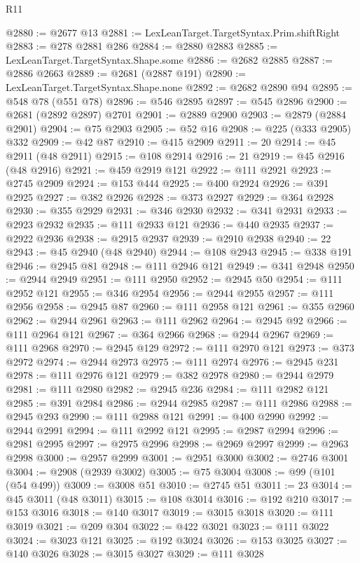 \begin{lexlean}{R11}
\begin{coremodule}
@2880 := @2677 @13
@2881 := LexLeanTarget.TargetSyntax.Prim.shiftRight
@2883 := @278 @2881 @286
@2884 := @2880 @2883
@2885 := LexLeanTarget.TargetSyntax.Shape.some
@2886 := @2682 @2885
@2887 := @2886 @2663
@2889 := @2681 (@2887 @191)
@2890 := LexLeanTarget.TargetSyntax.Shape.none
@2892 := @2682 @2890 @94
@2895 := @548 @78 (@551 @78)
@2896 := @546 @2895
@2897 := @545 @2896
@2900 := @2681 (@2892 @2897) @2701
@2901 := @2889 @2900
@2903 := @2879 (@2884 @2901)
@2904 := @75 @2903
@2905 := @52 @16
@2908 := @225 (@333 @2905) @332
@2909 := @42 @87
@2910 := @415 @2909
@2911 := 20
@2914 := @45 @2911 (@48 @2911)
@2915 := @108 @2914
@2916 := 21
@2919 := @45 @2916 (@48 @2916)
@2921 := @459 @2919 @121
@2922 := @111 @2921
@2923 := @2745 @2909
@2924 := @153 @444
@2925 := @400 @2924
@2926 := @391 @2925
@2927 := @382 @2926
@2928 := @373 @2927
@2929 := @364 @2928
@2930 := @355 @2929
@2931 := @346 @2930
@2932 := @341 @2931
@2933 := @2923 @2932
@2935 := @111 @2933 @121
@2936 := @440 @2935
@2937 := @2922 @2936
@2938 := @2915 @2937
@2939 := @2910 @2938
@2940 := 22
@2943 := @45 @2940 (@48 @2940)
@2944 := @108 @2943
@2945 := @338 @191
@2946 := @2945 @81
@2948 := @111 @2946 @121
@2949 := @341 @2948
@2950 := @2944 @2949
@2951 := @111 @2950
@2952 := @2945 @50
@2954 := @111 @2952 @121
@2955 := @346 @2954
@2956 := @2944 @2955
@2957 := @111 @2956
@2958 := @2945 @87
@2960 := @111 @2958 @121
@2961 := @355 @2960
@2962 := @2944 @2961
@2963 := @111 @2962
@2964 := @2945 @92
@2966 := @111 @2964 @121
@2967 := @364 @2966
@2968 := @2944 @2967
@2969 := @111 @2968
@2970 := @2945 @129
@2972 := @111 @2970 @121
@2973 := @373 @2972
@2974 := @2944 @2973
@2975 := @111 @2974
@2976 := @2945 @231
@2978 := @111 @2976 @121
@2979 := @382 @2978
@2980 := @2944 @2979
@2981 := @111 @2980
@2982 := @2945 @236
@2984 := @111 @2982 @121
@2985 := @391 @2984
@2986 := @2944 @2985
@2987 := @111 @2986
@2988 := @2945 @293
@2990 := @111 @2988 @121
@2991 := @400 @2990
@2992 := @2944 @2991
@2994 := @111 @2992 @121
@2995 := @2987 @2994
@2996 := @2981 @2995
@2997 := @2975 @2996
@2998 := @2969 @2997
@2999 := @2963 @2998
@3000 := @2957 @2999
@3001 := @2951 @3000
@3002 := @2746 @3001
@3004 := @2908 (@2939 @3002)
@3005 := @75 @3004
@3008 := @99 (@101 (@54 @499))
@3009 := @3008 @51
@3010 := @2745 @51
@3011 := 23
@3014 := @45 @3011 (@48 @3011)
@3015 := @108 @3014
@3016 := @192 @210
@3017 := @153 @3016
@3018 := @140 @3017
@3019 := @3015 @3018
@3020 := @111 @3019
@3021 := @209 @304
@3022 := @422 @3021
@3023 := @111 @3022
@3024 := @3023 @121
@3025 := @192 @3024
@3026 := @153 @3025
@3027 := @140 @3026
@3028 := @3015 @3027
@3029 := @111 @3028

\end{coremodule}
\end{lexlean}
